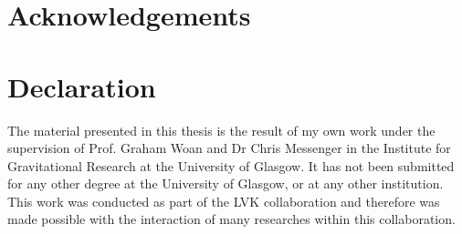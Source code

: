 \section*{Acknowledgements}


\section*{Declaration}

The material presented in this thesis is the result of my own work under the supervision of Prof. Graham Woan and Dr Chris Messenger in the Institute for Gravitational Research at the University of Glasgow. It has not been submitted for any other degree at the University of Glasgow, or at any other institution.
This work was conducted as part of the \gls{LVK} collaboration and therefore was made possible with the interaction of many researches within this collaboration.
